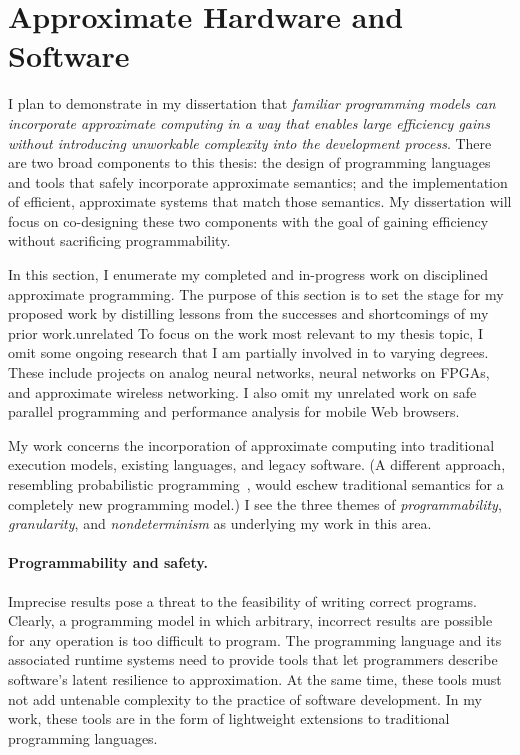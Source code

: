 \section{Approximate Hardware and Software}

I plan to demonstrate in my dissertation that \textit{familiar programming
models can incorporate approximate computing in a way that enables large
efficiency gains without introducing unworkable complexity into the
development process}. There are two broad components to this thesis: the
design of programming languages and tools that safely incorporate approximate
semantics; and the implementation of efficient, approximate systems that match
those semantics. My dissertation will focus on co-designing these two
components with the goal of gaining efficiency without sacrificing
programmability.



In this section, I enumerate my completed and in-progress work on
disciplined approximate programming. The purpose of this section is to set the stage
for my proposed work by distilling lessons from the successes and shortcomings
of my prior work.unrelated 
To focus on the work most relevant to my thesis topic, I omit some ongoing
research that I am partially involved in to varying degrees. These include
projects on analog neural networks, neural networks on FPGAs, and approximate
wireless networking.
I also omit my unrelated work on safe parallel programming and
performance analysis for mobile Web browsers.

My work concerns the incorporation of approximate computing
into traditional execution models, existing
languages, and legacy software.
(A different approach, resembling probabilistic
programming~\cite{church}, would eschew traditional semantics for a completely
new programming model.)
I see the three themes of \emph{programmability},
\emph{granularity}, and \emph{nondeterminism} as underlying my work in this
area.

\paragraph{Programmability and safety.}

Imprecise results pose a threat to the feasibility of writing correct
programs. Clearly, a programming model in which arbitrary, incorrect results
are possible for any operation is too difficult to program. The programming
language and its associated runtime systems need to provide tools that let
programmers describe software's latent resilience to approximation. At the
same time, these tools must not add
untenable
complexity to the practice of software development. In my work, these
tools are in the form of lightweight extensions to traditional programming
languages.

